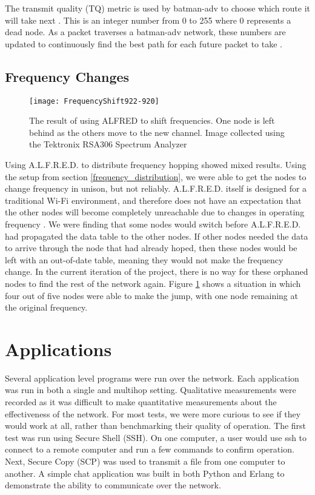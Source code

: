 The transmit quality (TQ) metric is used by batman-adv to choose which route it will take next \cite{0037}. This is an integer number from 0 to 255 where 0 represents a dead node. As a packet traverses a batman-adv network, these numbers are updated to continuously find the best path for each future packet to take \cite{0037}.



\subsection{Frequency Changes}

\begin{figure}
	\centering
	\texttt{[image: FrequencyShift922-920]}
	\caption{The result of using ALFRED to shift frequencies. One node is left behind as the others move to the new channel. Image collected using the Tektronix RSA306 Spectrum Analyzer}
	\label{fig:freqshift}
\end{figure}


Using A.L.F.R.E.D. to distribute frequency hopping showed mixed results. Using the setup from section \ref{frequency_distribution}, we were able to get the nodes to change frequency in unison, but not reliably. A.L.F.R.E.D. itself is designed for a traditional Wi-Fi environment, and therefore does not have an expectation that the other nodes will become completely unreachable due to changes in operating frequency \cite{0015}. We were finding that some nodes would switch before A.L.F.R.E.D. had propagated the data table to the other nodes. If other nodes needed the data to arrive through the node that had already hoped, then these nodes would be left with an out-of-date table, meaning they would not make the frequency change. In the current iteration of the project, there is no way for these orphaned nodes to find the rest of the network again. Figure \ref{fig:freqshift} shows a situation in which four out of five nodes were able to make the jump, with one node remaining at the original frequency.

\section{Applications}


Several application level programs were run over the network. Each application was run in both a single and multihop setting. Qualitative measurements were recorded as it was difficult to make quantitative measurements about the effectiveness of the network. For most tests, we were more curious to see if they would work at all, rather than benchmarking their quality of operation. The first test was run using Secure Shell (SSH). On one computer, a user would use ssh to connect to a remote computer and run a few commands to confirm operation. Next, Secure Copy (SCP) was used to transmit a file from one computer to another. A simple chat application was built in both Python and Erlang to demonstrate the ability to communicate over the network. 



